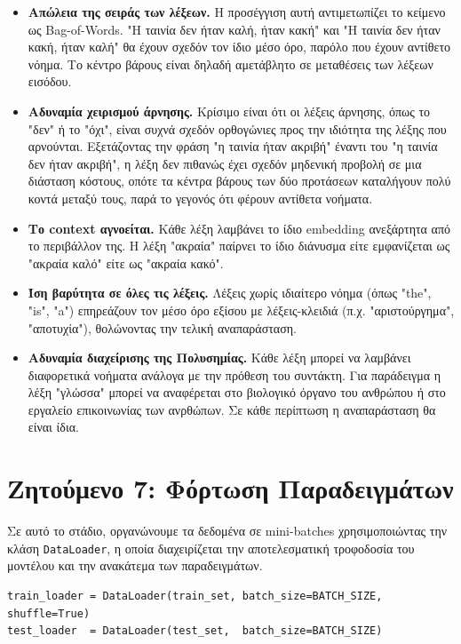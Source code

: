 \documentclass[12pt]{article}
\begin{document}
\begin{itemize}
    \item \textbf{Απώλεια της σειράς των λέξεων.} Η προσέγγιση αυτή αντιμετωπίζει το κείμενο ως Bag-of-Words. "Η ταινία δεν ήταν καλή, ήταν κακή" και "Η ταινία δεν ήταν κακή, ήταν καλή" θα έχουν σχεδόν τον ίδιο μέσο όρο, παρόλο που έχουν αντίθετο νόημα. Το κέντρο βάρους είναι δηλαδή αμετάβλητο σε μεταθέσεις των λέξεων εισόδου.

     \item \textbf{Αδυναμία χειρισμού άρνησης.} Κρίσιμο είναι ότι οι λέξεις άρνησης, όπως το "δεν" ή το "όχι", είναι συχνά σχεδόν ορθογώνιες προς την ιδιότητα της λέξης που αρνούνται. Εξετάζοντας την φράση "η ταινία ήταν ακριβή" έναντι του "η ταινία δεν ήταν ακριβή", η λέξη δεν πιθανώς έχει σχεδόν μηδενική προβολή σε μια διάσταση κόστους, οπότε τα κέντρα βάρους των δύο προτάσεων καταλήγουν πολύ κοντά μεταξύ τους, παρά το γεγονός ότι φέρουν αντίθετα νοήματα.

    \item \textbf{Το context αγνοείται.} Κάθε λέξη λαμβάνει το ίδιο embedding ανεξάρτητα από το περιβάλλον της. Η λέξη "ακραία" παίρνει το ίδιο διάνυσμα είτε εμφανίζεται ως "ακραία καλό" είτε ως "ακραία κακό".

    \item \textbf{Ίση βαρύτητα σε όλες τις λέξεις.} Λέξεις χωρίς ιδιαίτερο νόημα (όπως "the", "is", "a") επηρεάζουν τον μέσο όρο εξίσου με λέξεις-κλειδιά (π.χ. "αριστούργημα", "αποτυχία"), θολώνοντας την τελική αναπαράσταση.

    \item \textbf{Αδυναμία διαχείρισης της Πολυσημίας.} Κάθε λέξη μπορεί να λαμβάνει διαφορετικά νοήματα ανάλογα με την πρόθεση του συντάκτη. Για παράδειγμα η λέξη "γλώσσα" μπορεί να αναφέρεται στο βιολογικό όργανο του ανθρώπου ή στο εργαλείο επικοινωνίας των ανρθώπων. Σε κάθε περίπτωση η αναπαράσταση θα είναι ίδια.
\end{itemize}

\section{Ζητούμενο 7: Φόρτωση Παραδειγμάτων}

Σε αυτό το στάδιο, οργανώνουμε τα δεδομένα σε mini-batches χρησιμοποιώντας την κλάση \texttt{DataLoader}, η οποία διαχειρίζεται την αποτελεσματική τροφοδοσία του μοντέλου και την ανακάτεμα των παραδειγμάτων.

\begin{lstlisting}
train_loader = DataLoader(train_set, batch_size=BATCH_SIZE, shuffle=True)
test_loader  = DataLoader(test_set,  batch_size=BATCH_SIZE)
\end{lstlisting}
\end{document}
